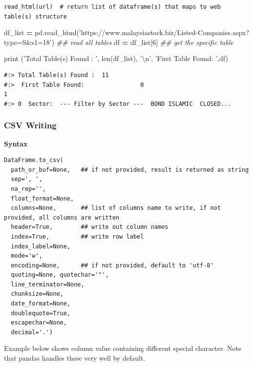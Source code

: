 \documentclass[
]{book}
\newenvironment{Shaded}{\begin{snugshade}}{\end{snugshade}}
\newcommand{\BuiltInTok}[1]{#1}
\newcommand{\CharTok}[1]{\textcolor[rgb]{0.5,0.5,0.5}{#1}}
\newcommand{\CommentTok}[1]{\textcolor[rgb]{0.37,0.37,0.37}{\textit{#1}}}
\newcommand{\DecValTok}[1]{\textcolor[rgb]{0.06,0.06,0.06}{#1}}
\newcommand{\NormalTok}[1]{#1}
\newcommand{\OperatorTok}[1]{\textcolor[rgb]{0.43,0.43,0.43}{\textbf{#1}}}
\newcommand{\StringTok}[1]{\textcolor[rgb]{0.5,0.5,0.5}{#1}}
\begin{document}
\begin{verbatim}
read_html(url)  # return list of dataframe(s) that maps to web table(s) structure
\end{verbatim}

\begin{Shaded}
\begin{Highlighting}[]
\NormalTok{df_list }\OperatorTok{=}\NormalTok{ pd.read_html(}\StringTok{'https://www.malaysiastock.biz/Listed-Companies.aspx?type=S&s1=18'}\NormalTok{)  }\CommentTok{## read all tables}
\NormalTok{df }\OperatorTok{=}\NormalTok{ df_list[}\DecValTok{6}\NormalTok{]  }\CommentTok{## get the specific table}

\BuiltInTok{print}\NormalTok{ (}\StringTok{'Total Table(s) Found : '}\NormalTok{, }\BuiltInTok{len}\NormalTok{(df_list), }\StringTok{'}\CharTok{\textbackslash{}n}\StringTok{'}\NormalTok{,}
       \StringTok{'First Table Found:      '}\NormalTok{,df)}
\end{Highlighting}
\end{Shaded}

\begin{verbatim}
#:> Total Table(s) Found :  11 
#:>  First Table Found:                0                                                  1
#:> 0  Sector:  --- Filter by Sector ---  BOND ISLAMIC  CLOSED...
\end{verbatim}

\hypertarget{csv-writing}{%
\subsubsection{CSV Writing}\label{csv-writing}}

\textbf{Syntax}

\begin{verbatim}
DataFrame.to_csv(
  path_or_buf=None,   ## if not provided, result is returned as string
  sep=', ', 
  na_rep='', 
  float_format=None, 
  columns=None,       ## list of columns name to write, if not provided, all columns are written
  header=True,        ## write out column names
  index=True,         ## write row label
  index_label=None, 
  mode='w', 
  encoding=None,      ## if not provided, default to 'utf-8'
  quoting=None, quotechar='"', 
  line_terminator=None, 
  chunksize=None, 
  date_format=None, 
  doublequote=True, 
  escapechar=None, 
  decimal='.')
\end{verbatim}

Example below shows column value containing different special character. Note that pandas handles these very well by default.
\end{document}
